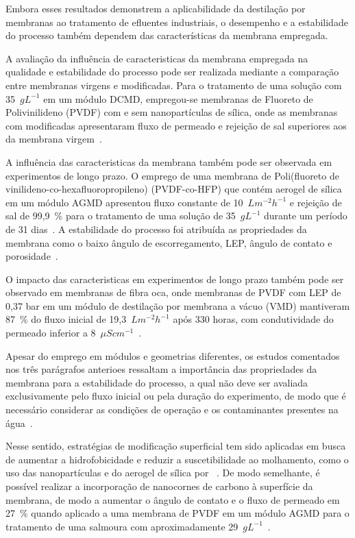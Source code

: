 Embora esses resultados demonstrem a aplicabilidade da destilação por membranas ao tratamento de efluentes industriais, o desempenho e a estabilidade do processo também dependem das características da membrana empregada.

A avaliação da influência de caracteristicas da membrana empregada na qualidade e estabilidade do processo pode ser realizada mediante a comparação entre membranas virgens e modificadas. Para o tratamento de uma solução com 35~$gL^{-1}$ em um módulo DCMD, empregou-se membranas de Fluoreto de Polivinilideno (PVDF) com e sem nanopartículas de sílica, onde as membranas com modificadas apresentaram fluxo de permeado e rejeição de sal superiores aos da membrana virgem~\cite{Su2017}.

A influência das caracteristicas da membrana também pode ser observada em experimentos de longo prazo. O emprego de uma membrana de Poli(fluoreto de vinilideno-co-hexafluoropropileno) (PVDF-co-HFP) que contém aerogel de sílica em um módulo AGMD apresentou fluxo constante de 10~$Lm^{-2}h^{-1}$ e rejeição de sal de 99,9~\% para o tratamento de uma solução de 35~$gL^{-1}$ durante um período de 31 dias~\cite{Woo2021ElectrospunMD}. A estabilidade do processo foi atribuída as propriedades da membrana como o baixo ângulo de escorregamento, LEP, ângulo de contato e porosidade~\cite{Woo2021ElectrospunMD}. 

O impacto das caracteristicas em experimentos de longo prazo também pode ser observado em membranas de fibra oca, onde membranas de PVDF com LEP de 0,37 bar em um módulo de destilação por membrana a vácuo (VMD)   mantiveram 87~\% do fluxo inicial de 19,3~$Lm^{-2}h^{-1}$ após 330 horas, com condutividade do permeado inferior a 8~$\mu Scm^{-1}$~\cite{Suga2021VMD}.

Apesar do emprego em módulos e geometrias diferentes, os estudos comentados nos três parágrafos anterioes ressaltam a importância das propriedades da membrana para a estabilidade do processo, a qual não deve ser avaliada exclusivamente pelo fluxo inicial ou pela duração do experimento, de modo que é necessário considerar as condições de operação e os contaminantes presentes na água~\cite{Su2017,Woo2021ElectrospunMD,Suga2021VMD}. 

Nesse sentido, estratégias de modificação superficial tem sido aplicadas em busca de aumentar a hidrofobicidade e reduzir a suscetibilidade ao molhamento, como o uso das nanopartículas e do aerogel de sílica por ~\cite{Su2017,Woo2021ElectrospunMD}. De modo semelhante, é possível realizar a incorporação de nanocornes de carbono à superfície da membrana, de modo a aumentar o ângulo de contato e o fluxo de permeado em 27~\% quando aplicado a uma membrana de PVDF em um módulo AGMD para o tratamento de uma salmoura com aproximadamente 29~$gL^{-1}$~\cite{Kujawa_PVDF_SWCNH}.

